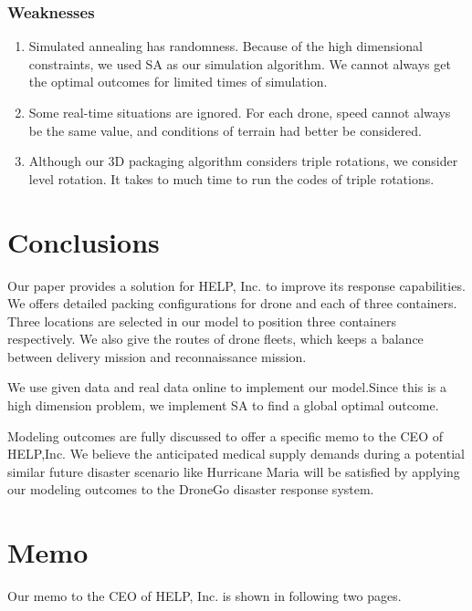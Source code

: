 \documentclass{mcmthesis}
\begin{document}
\subsubsection{Weaknesses}

\begin{enumerate}
    \item Simulated annealing has randomness. Because of the high dimensional constraints, we used SA as our simulation algorithm. We cannot always get the optimal outcomes for limited times of simulation.
    \item Some real-time situations are ignored. For each drone, speed cannot always be the same value, and conditions of terrain had better be considered.
    \item Although our 3D packaging algorithm considers triple rotations, we consider level rotation. It takes to much time to run the codes of triple rotations.
\end{enumerate}



\section{Conclusions}\label{Sec:conc}

Our paper provides a solution for HELP, Inc. to improve its response capabilities. We offers detailed packing configurations for drone and each of three containers. Three locations are selected in our model to position three containers respectively. We also give the routes of drone fleets, which keeps a balance between delivery mission and reconnaissance mission.

We use given data and real data online to implement our model.Since this is a high dimension problem, we implement SA to find a global optimal outcome.

Modeling outcomes are fully discussed to offer a specific memo to the CEO of HELP,Inc. We believe the anticipated medical supply demands during a potential similar future disaster scenario like Hurricane Maria will be satisfied by applying our modeling outcomes to the DroneGo disaster response system.


\section{Memo}\label{Sec:memo}
Our memo to the CEO of HELP, Inc. is shown in following two pages.
\newpage\label{page}

\end{document}
